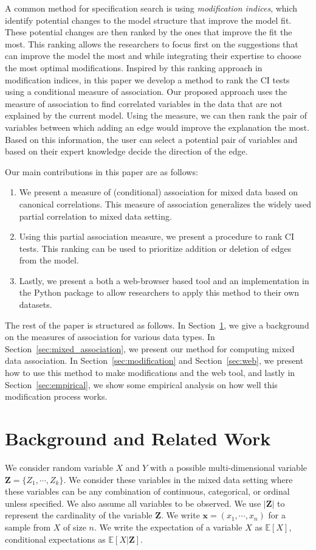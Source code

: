 \documentclass[letterpaper]{article} %
\begin{document}
A common method for specification search is using \emph{modification indices},
which identify potential changes to the model structure that improve the model
fit. These potential changes are then ranked by the ones that improve the fit
the most. This ranking allows the researchers to focus first on the suggestions
that can improve the model the most and while integrating their expertise to
choose the most optimal modifications. Inspired by this ranking approach in
modification indices, in this paper we develop a method to rank the CI tests
using a conditional measure of association. Our proposed approach uses the
measure of association to find correlated variables in the data that are not
explained by the current model. Using the measure, we can then rank the pair of
variables between which adding an edge would improve the explanation the most.
Based on this information, the user can select a potential pair of variables
and based on their expert knowledge decide the direction of the edge. 

Our main contributions in this paper are as follows:
\begin{enumerate}
	\item We present a measure of (conditional) association for mixed data
		based on canonical correlations. This measure of association
		generalizes the widely used partial correlation to mixed data
		setting.
	\item Using this partial association measure, we present a procedure to
		rank CI tests. This ranking can be used to prioritize addition
		or deletion of edges from the model.
	\item Lastly, we present a both a web-browser based tool and an
		implementation in the Python package to allow researchers to
		apply this method to their own datasets.
\end{enumerate}

The rest of the paper is structured as follows. In
Section~\ref{sec:background}, we give a background on the measures of
association for various data types. In Section~\ref{sec:mixed_association}, we
present our method for computing mixed data association. In
Section~\ref{sec:modification} and Section~\ref{sec:web}, we present how to use
this method to make modifications and the web tool, and lastly in
Section~\ref{sec:empirical}, we show some empirical analysis on how well this
modification process works.

\section{Background and Related Work}
\label{sec:background}
We consider random variable $ X $ and $ Y $ with a possible multi-dimensional
variable $ \bm{Z} = \{ Z_1, \cdots, Z_k \} $. We consider these variables in
the mixed data setting where these variables can be any combination of
continuous, categorical, or ordinal unless specified. We also assume all
variables to be observed. We use $ \rvert \bm{Z} \rvert $ to represent the
cardinality of the variable $ \bm{Z} $. We write $ \bm{x} = (x_1, \cdots, x_n)
$ for a sample from $ X $ of size $ n $. We write the expectation of a variable
$ X $ as $ \mathbb{E}[X] $, conditional expectations as $ \mathbb{E}[X |
\bm{Z}] $.
\end{document}

